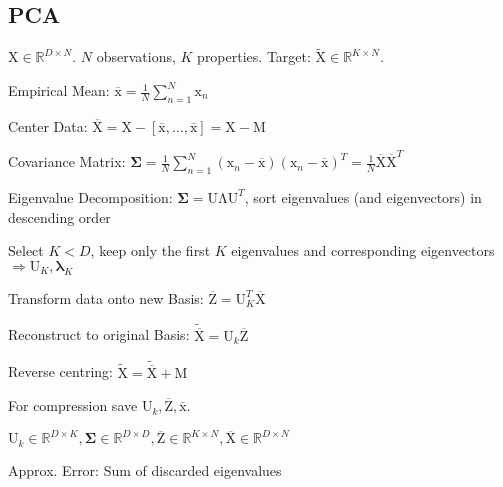 \documentclass[a4paper, 11pt, landscape]{article}
\newcommand{\matr}[1]{\boldsymbol{\mathrm{#1}}}
\begin{document}
\begin{multicols*}{3}

\section{PCA}
$\matr{X} \in \mathbb{R}^{D \times N}$. $N$ observations, $K$ properties. Target: $\tilde{\matr{X}} \in \mathbb{R}^{K \times N}$.
\begin{compactenum}
	\item Empirical Mean: $\overline{\matr{x}} = \frac{1}{N} \sum_{n=1}^N \matr{x}_n$
	\item Center Data: $\overline{\matr{X}} = \matr{X} - [\overline{\matr{x}}, \ldots, \overline{\matr{x}}] = \matr{X} - \matr{M}$
	\item Covariance Matrix: $\boldsymbol{\Sigma} = \frac{1}{N	} \sum_{n=1}^N (\matr{x}_n - \overline{\matr{x}}) (\matr{x}_n - \overline{\matr{x}})^T = \frac{1}{N} \overline{\matr{X}}\overline{\matr{X}}^T$
	\item Eigenvalue Decomposition: $\boldsymbol{\Sigma} = \matr{U \Lambda U}^T$, sort eigenvalues (and eigenvectors) in descending order
	\item Select $K < D$, keep only the first $K$ eigenvalues and corresponding eigenvectors $\Rightarrow \matr{U}_K, \boldsymbol{\lambda}_K$
	\item Transform data onto new Basis: $\overline{\matr{Z}} = \matr{U}_K^T \overline{\matr{X}}$
	\item Reconstruct to original Basis: $\tilde{\overline{\matr{X}}} = \matr{U}_k \overline{\matr{Z}}$
	\item Reverse centring: $\tilde{\matr{X}} = \tilde{\overline{\matr{X}}} + \matr{M}$
\end{compactenum}

\begin{compactitem}
	\item For compression save $\matr{U}_k, \overline{\matr{Z}}, \overline{\matr{x}}$.
	\item $\matr{U}_k \in \mathbb{R}^{D \times K}, \boldsymbol{\Sigma} \in \mathbb{R}^{D \times D}, \overline{\matr{Z}} \in \mathbb{R}^{K \times N}, \overline{\matr{X}} \in \mathbb{R}^{D \times N}$
\end{compactitem}

\begin{compactdesc}
	\item[Approx. Error:] Sum of discarded eigenvalues
\end{compactdesc}


\end{multicols*}
\end{document}
